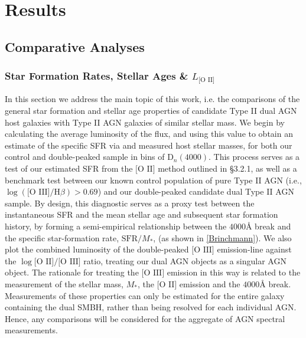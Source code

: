 \section{Results}

\subsection{Comparative Analyses}

\subsubsection{Star Formation Rates, Stellar Ages \& $L_{\text{[O II]}}$}

In this section we address the main topic of this work, i.e. the comparisons of the general star formation and stellar age properties of candidate Type II dual AGN host galaxies with Type II AGN galaxies of similar stellar mass. We begin by calculating the average luminosity of the \text{[O II]} flux, and using this value to obtain an estimate of the specific SFR via \label{eq:Kewley} and measured host stellar masses, for both our control and double-peaked sample in bins of $\text{D}_n(4000)$. This process serves as a test of our estimated SFR from the $\text{[O II]}$ method outlined in §3.2.1, as well as a benchmark test between our known control population of pure Type II AGN (i.e., $\log{(\text{[O III]}/\text{H}\beta)}>{0.69}$) and our double-peaked candidate dual Type II AGN sample. By design, this diagnostic serves as a proxy test between the instantaneous SFR and the mean stellar age and subsequent star formation history, by forming a semi-empirical relationship between the $4000Å$ break and the specific star-formation rate, $\text{SFR}/M_{*}$, (as shown in \ref{Brinchmann}). We also plot the combined luminosity of the double-peaked $\text{[O III]}$ emission-line against the $\log{\text{[O II]}/\text{[O III]}}$ ratio, treating our dual AGN objects as a singular AGN object. The rationale for treating the $\text{[O III]}$ emission in this way is related to the measurement of the stellar mass, $M_{*}$, the $\text{[O II]}$ emission and the $4000Å$ break. Measurements of these properties can only be estimated for the entire galaxy containing the dual SMBH, rather than being resolved for each individual AGN. Hence, any comparisons will be considered for the aggregate of AGN spectral measurements.

